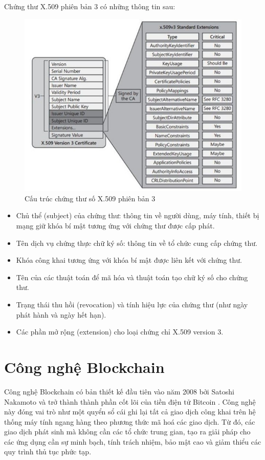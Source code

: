 Chứng thư X.509 phiên bản 3 có những thông tin sau:
\begin{figure}[htbp]
\centering
\includegraphics[width=.9\linewidth]{img/x509v3.jpg}
\caption{Cấu trúc chứng thư số X.509 phiên bản 3}
\end{figure}
\begin{itemize}

\item Chủ thể (subject) của chứng thư: thông tin về người dùng, máy tính, thiết bị mạng giữ khóa bí mật tương ứng với chứng thư được cấp phát.
\item Tên dịch vụ chứng thực chữ ký số: thông tin về tổ chức cung cấp chứng thư.
\item Khóa công khai tương ứng với khóa bí mật được liên kết với chứng thư.
\item Tên của các thuật toán để mã hóa và thuật toán tạo chữ ký số cho chứng thư.
\item Trạng thái thu hồi (revocation) và tính hiệu lực của chứng thư (như ngày phát hành và ngày hết hạn).
\item Các phần mở rộng (extension) cho loại chứng chỉ X.509 version 3.

\end{itemize}


\section{Công nghệ Blockchain}

Công nghệ Blockchain có bản thiết kế đầu tiên vào năm 2008 bởi Satoshi Nakamoto và trở thành thành phần cốt lõi của tiền điện tử Bitcoin \cite{nakamoto2008bitcoin}. Công nghệ này đóng vai trò như một quyển sổ cái ghi lại tất cả giao dịch công khai trên hệ thống máy tính ngang hàng theo phương thức mã hoá các giao dịch. Từ đó, các giao dịch phát sinh mà không cần các tổ chức trung gian, tạo ra giải pháp cho các ứng dụng cần sự minh bạch, tính trách nhiệm, bảo mật cao và giảm thiểu các quy trình thủ tục phức tạp.

